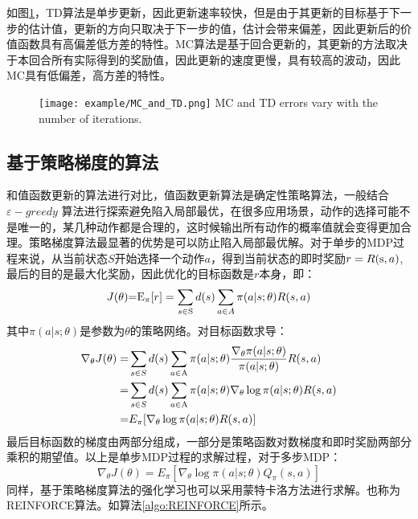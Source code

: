 如图\ref{fig:4}，TD算法是单步更新，因此更新速率较快，但是由于其更新的目标基于下一步的估计值，更新的方向只取决于下一步的值，估计会带来偏差，因此更新后的价值函数具有高偏差低方差的特性。MC算法是基于回合更新的，其更新的方法取决于本回合所有实际得到的奖励值，因此更新的速度更慢，具有较高的波动，因此MC具有低偏差，高方差的特性。
\begin{figure}[htpb]
	\centering
	\texttt{[image: example/MC\_and\_TD.png]}
	{MC and TD errors vary with the number of iterations.}
	\label{fig:4}
\end{figure}
\subsection{基于策略梯度的算法}
和值函数更新的算法进行对比，值函数更新算法是确定性策略算法，一般结合$\varepsilon - greedy$ 算法进行探索避免陷入局部最优，在很多应用场景，动作的选择可能不是唯一的，某几种动作都是合理的，这时候输出所有动作的概率值就会变得更加合理。策略梯度算法最显著的优势是可以防止陷入局部最优解。对于单步的MDP过程来说，从当前状态$S$开始选择一个动作$a$，得到当前状态的即时奖励$ r = R({\rm{s}},a) $,最后的目的是最大化奖励，因此优化的目标函数是$r$本身，即：
\begin{equation}
J(\theta ){\rm{ = }}{{\rm{E}}_\pi }[r] = \sum\limits_{s \in {\rm{S}}} {d(s)\sum\limits_{a \in A} {\pi (a|s;\theta )} } R(s,a)
\end{equation}
其中${\pi (a|s;\theta )}$是参数为$\theta$的策略网络。对目标函数求导：
\begin{equation}
\begin{split}
{\nabla _\theta }J(\theta ) =& \sum\limits_{s \in S} {d(s)\sum\limits_{a \in {\rm{A}}} {\pi (a|s;\theta )} } \frac{{{\nabla _\theta }\pi (a|s;\theta )}}{{\pi (a|s;\theta )}}R(s,a) \\
=& \sum\limits_{s \in S} {d(s)\sum\limits_{a \in {\rm{A}}} {\pi (a|s;\theta )} } {\nabla _\theta }\log \pi (a|s;\theta )R(s,a) \\
=& {E_\pi }[{\nabla _\theta }\log \pi (a|s;\theta )R(s,a)]
\end{split}
\end{equation}
最后目标函数的梯度由两部分组成，一部分是策略函数对数梯度和即时奖励两部分乘积的期望值。以上是单步MDP过程的求解过程，对于多步MDP：
\begin{equation}
{\nabla _\theta }J(\theta ) = {E_\pi }[{\nabla _\theta }\log \pi (a|s;\theta ){Q_\pi }(s,a)]
\end{equation}
同样，基于策略梯度算法的强化学习也可以采用蒙特卡洛方法进行求解。也称为REINFORCE算法\cite{williams1992simple}。如算法\ref{algo:REINFORCE}所示。

